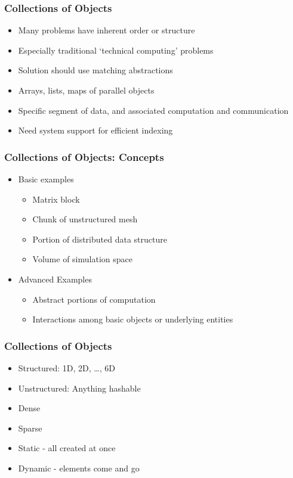 
\begin{frame}[fragile]
  \frametitle{Collections of Objects}
  \begin{itemize}
    \item Many problems have inherent order or structure
    \item Especially traditional `technical computing' problems
    \item Solution should use matching abstractions
    \item Arrays, lists, maps of parallel objects
    \item Specific segment of data, and associated computation and
      communication
    \item Need system support for efficient indexing
  \end{itemize}
\end{frame}

\begin{frame}[fragile]
  \frametitle{Collections of Objects: Concepts}
  \begin{itemize}
    \item Basic examples
      \begin{itemize}
      \item Matrix block
      \item Chunk of unstructured mesh
      \item Portion of distributed data structure
      \item Volume of simulation space
      \end{itemize}
      \pause
    \item Advanced Examples
      \begin{itemize}
      \item Abstract portions of computation
      \item Interactions among basic objects or underlying entities
      \end{itemize}
  \end{itemize}
\end{frame}

\begin{frame}[fragile]
  \frametitle{Collections of Objects}
  \begin{itemize}
    \item Structured: 1D, 2D, \ldots, 6D
    \item Unstructured: Anything hashable
      \pause
    \item Dense
    \item Sparse
      \pause
    \item Static - all created at once
    \item Dynamic - elements come and go
  \end{itemize}
\end{frame}

